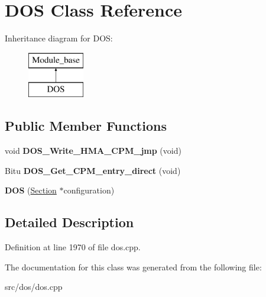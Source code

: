 \hypertarget{classDOS}{\section{D\-O\-S Class Reference}
\label{classDOS}
}
Inheritance diagram for D\-O\-S\-:\begin{figure}[H]
\begin{center}
\leavevmode
\includegraphics[height=2.000000cm]{classDOS}
\end{center}
\end{figure}
\subsection*{Public Member Functions}
\begin{DoxyCompactItemize}
\item 
\hypertarget{classDOS_a298dcab5e49ceecb15a2c1d9c4871866}{void {\bfseries D\-O\-S\-\_\-\-Write\-\_\-\-H\-M\-A\-\_\-\-C\-P\-M\-\_\-jmp} (void)}\label{classDOS_a298dcab5e49ceecb15a2c1d9c4871866}

\item 
\hypertarget{classDOS_a1fd7a02e49365782f597f1e4e0d67779}{Bitu {\bfseries D\-O\-S\-\_\-\-Get\-\_\-\-C\-P\-M\-\_\-entry\-\_\-direct} (void)}\label{classDOS_a1fd7a02e49365782f597f1e4e0d67779}

\item 
\hypertarget{classDOS_ad9dde79e7c7a3940e8aec707edc6e4ac}{{\bfseries D\-O\-S} (\hyperlink{classSection}{Section} $\ast$configuration)}\label{classDOS_ad9dde79e7c7a3940e8aec707edc6e4ac}

\end{DoxyCompactItemize}


\subsection{Detailed Description}


Definition at line 1970 of file dos.\-cpp.



The documentation for this class was generated from the following file\-:\begin{DoxyCompactItemize}
\item 
src/dos/dos.\-cpp\end{DoxyCompactItemize}

